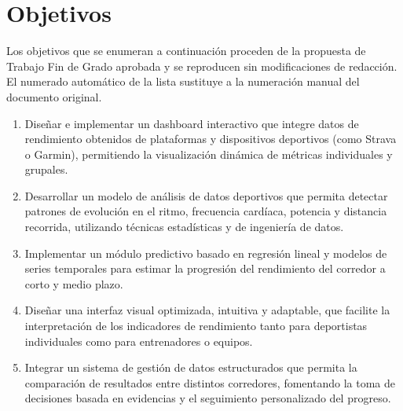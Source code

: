 \chapter{Objetivos}
\label{ch:objetivos}

Los objetivos que se enumeran a continuación proceden de la propuesta de Trabajo
Fin de Grado aprobada y se reproducen sin modificaciones de redacción. El
numerado automático de la lista sustituye a la numeración manual del documento
original.

\begin{enumerate}[label=\arabic*.,leftmargin=*]
  \item Diseñar e implementar un dashboard interactivo que integre datos de
        rendimiento obtenidos de plataformas y dispositivos deportivos (como
        Strava o Garmin), permitiendo la visualización dinámica de métricas
        individuales y grupales.

  \item Desarrollar un modelo de análisis de datos deportivos que permita
        detectar patrones de evolución en el ritmo, frecuencia cardíaca,
        potencia y distancia recorrida, utilizando técnicas estadísticas y de
        ingeniería de datos.

  \item Implementar un módulo predictivo basado en regresión lineal y modelos de
        series temporales para estimar la progresión del rendimiento del
        corredor a corto y medio plazo.

  \item Diseñar una interfaz visual optimizada, intuitiva y adaptable, que
        facilite la interpretación de los indicadores de rendimiento tanto para
        deportistas individuales como para entrenadores o equipos.

  \item Integrar un sistema de gestión de datos estructurados que permita la
        comparación de resultados entre distintos corredores, fomentando la toma
        de decisiones basada en evidencias y el seguimiento personalizado del
        progreso.
\end{enumerate}

